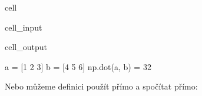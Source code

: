 \documentclass[letterpaper,10pt,english]{jupyterBook}
\begin{document}
\begin{sphinxuseclass}{cell}\begin{sphinxVerbatimInput}

\begin{sphinxuseclass}{cell_input}
\begin{sphinxVerbatim}[commandchars=\\\{\}]
  \PYG{p}{[}  \PYG{p}{]}
  \PYG{p}{[}  \PYG{p}{]}
   
  
\end{sphinxVerbatim}

\end{sphinxuseclass}\end{sphinxVerbatimInput}
\begin{sphinxVerbatimOutput}

\begin{sphinxuseclass}{cell_output}
\begin{sphinxVerbatim}[commandchars=\\\{\}]
a = [1 2 3] 
b = [4 5 6]
np.dot(a, b) = 32
\end{sphinxVerbatim}

\end{sphinxuseclass}\end{sphinxVerbatimOutput}

\end{sphinxuseclass}
\sphinxAtStartPar
Nebo můžeme definici použít přímo a spočítat přímo:
\end{document}
